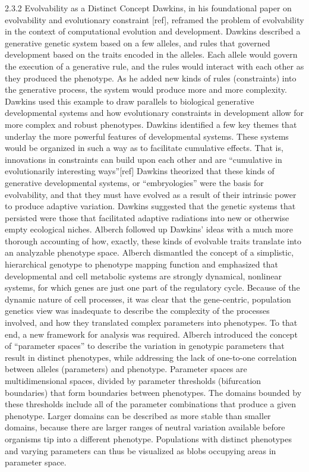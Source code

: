 2.3.2 Evolvability as a Distinct Concept
Dawkins, in his foundational paper on evolvability and evolutionary constraint [ref], reframed the problem of evolvability in the context of computational evolution and development.  Dawkins described a generative genetic system based on a few alleles, and rules that governed development based on the traits encoded in the alleles.  Each allele would govern the execution of a generative rule, and the rules would interact with each other as they produced the phenotype. As he added new kinds of rules (constraints) into the generative process, the system would produce more and more complexity.
Dawkins used this example to draw parallels to biological generative developmental systems and how evolutionary constraints in development allow for more complex and robust phenotypes. Dawkins identified a few key themes that underlay the more powerful features of developmental systems. These systems would be organized in such a way as to facilitate cumulative effects. That is, innovations in constraints can build upon each other and are “cumulative in evolutionarily interesting ways”[ref]
Dawkins theorized that these kinds of generative developmental systems, or “embryologies” were the basis for evolvability, and that they must have evolved as a result of their intrinsic power to produce adaptive variation. Dawkins suggested that the genetic systems that persisted were those that facilitated adaptive radiations into new or otherwise empty ecological niches.
Alberch followed up Dawkins’ ideas with a much more thorough accounting of how, exactly, these kinds of evolvable traits translate into an analyzable phenotype space. Alberch dismantled the concept of a simplistic, hierarchical genotype to phenotype mapping function and emphasized that developmental and cell metabolic systems are strongly dynamical, nonlinear systems, for which genes are just one part of the regulatory cycle. Because of the dynamic nature of cell processes, it was clear that the gene-centric, population genetics view was inadequate to describe the complexity of the processes involved, and how they translated complex parameters into phenotypes. To that end, a new framework for analysis was required.
Alberch introduced the concept of “parameter spaces” to describe the variation in genotypic parameters that result in distinct phenotypes, while addressing the lack of one-to-one correlation between alleles (parameters) and phenotype. Parameter spaces are multidimensional spaces, divided by parameter thresholds (bifurcation boundaries) that form boundaries between phenotypes.  The domains bounded by these thresholds include all of the parameter combinations that produce a given phenotype. Larger domains can be described as more stable than smaller domains, because there are larger ranges of neutral variation available before organisms tip into a different phenotype. Populations with distinct phenotypes and varying parameters can thus be visualized as blobs occupying areas in parameter space.
